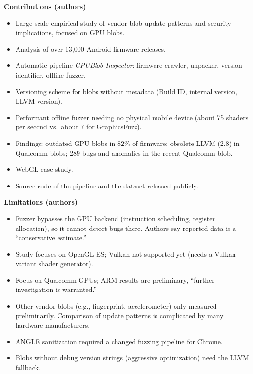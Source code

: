 \documentclass[11pt,a4paper]{article}
\begin{document}
\begin{enumerate}
    \textbf{Contributions (authors)}
    \begin{itemize}[leftmargin=*, itemsep=1pt, topsep=2pt]
        \item Large-scale empirical study of vendor blob update patterns and security implications, focused on GPU blobs.
        \item Analysis of over 13,000 Android firmware releases.
        \item Automatic pipeline \emph{GPUBlob-Inspector}: firmware crawler, unpacker, version identifier, offline fuzzer.
        \item Versioning scheme for blobs without metadata (Build ID, internal version, LLVM version).
        \item Performant offline fuzzer needing no physical mobile device (about 75 shaders per second vs.\ about 7 for GraphicsFuzz).
        \item Findings: outdated GPU blobs in 82\% of firmware; obsolete LLVM (2.8) in Qualcomm blobs; 289 bugs and anomalies in the recent Qualcomm blob.
        \item WebGL case study.
        \item Source code of the pipeline and the dataset released publicly.
    \end{itemize}

    \vspace{4pt}
    \textbf{Limitations (authors)}
    \begin{itemize}[leftmargin=*, itemsep=1pt, topsep=2pt]
        \item Fuzzer bypasses the GPU backend (instruction scheduling, register allocation), so it cannot detect bugs there. Authors say reported data is a ``conservative estimate.''
        \item Study focuses on OpenGL ES; Vulkan not supported yet (needs a Vulkan variant shader generator).
        \item Focus on Qualcomm GPUs; ARM results are preliminary, ``further investigation is warranted.''
        \item Other vendor blobs (e.g., fingerprint, accelerometer) only measured preliminarily. Comparison of update patterns is complicated by many hardware manufacturers.
        \item ANGLE sanitization required a changed fuzzing pipeline for Chrome.
        \item Blobs without debug version strings (aggressive optimization) need the LLVM fallback.
    \end{itemize}


\end{enumerate}
\end{document}
